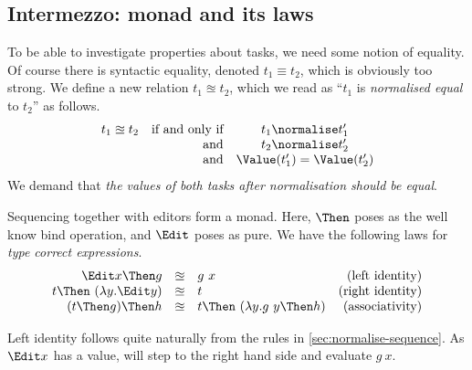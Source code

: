 \subsection{Intermezzo: monad and its laws}
\label{sec:monad-laws}

To be able to investigate properties about tasks,
we need some notion of equality.
Of course there is syntactic equality,
denoted $t_1 \equiv t_2$,
which is obviously too strong.
We define a new relation $t_1 \approxeq t_2$,
which we read as \enquote{$t_1$ is \emph{normalised equal} to $t_2$} as follows.
\begin{equation*}
  \begin{array}{crc}
    t_1 \approxeq t_2 &\text{if and only if}& t_1 \normalise t_1' \\
                      &\text{and}           & t_2 \normalise t_2' \\
                      &\text{and}           & \Value(t_1') = \Value(t_2') \\
  \end{array}
\end{equation*}
We demand that \emph{the values of both tasks after normalisation should be equal}.

Sequencing together with editors form a monad.
Here, $\Then$ poses as the well know bind operation,
and $\Edit$ poses as pure.
We have the following laws for \emph{type correct expressions}.
\begin{equation*}
  \begin{array}{rclr}
    \Edit x \Then g
      &\approxeq& g\ x
      & \text{(left identity)} \\
    t \Then\ (\lambda y. \Edit y)
      &\approxeq& t
      & \text{(right identity)} \\
    (t \Then g) \Then h
      &\approxeq& t \Then\ (\lambda y. g\ y \Then h)
      & \text{(associativity)}
  \end{array}
\end{equation*}

Left identity follows quite naturally from the rules in \autoref{sec:normalise-sequence}.
As $\Edit x$ has a value,
 will step to the right hand side and evaluate $g\ x$.

